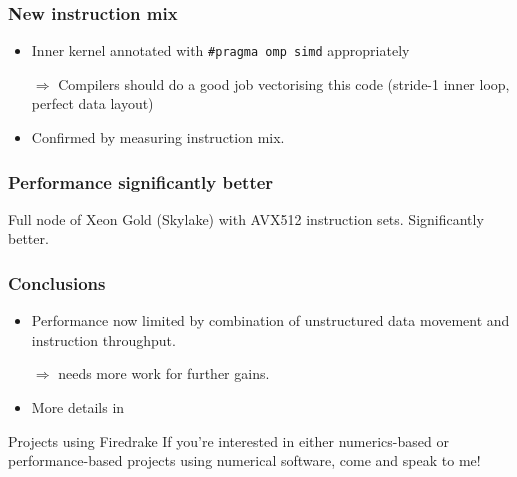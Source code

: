 \documentclass[presentation,aspectratio=43,10pt]{beamer}
\begin{document}
\begin{frame}
  \frametitle{New instruction mix}
  \begin{itemize}
  \item Inner kernel annotated with \texttt{\#pragma omp simd} appropriately
  \item[$\Rightarrow$] Compilers should do a good job vectorising this
    code (stride-1 inner loop, perfect data layout)
  \item Confirmed by measuring instruction mix.
    \begin{center}
    \end{center}
  \end{itemize}
\end{frame}

\begin{frame}
  \frametitle{Performance significantly better}
  \begin{center}
    Full node of Xeon Gold (Skylake) with AVX512 instruction sets.
    Significantly better.
  \end{center}
\end{frame}

\begin{frame}
  \frametitle{Conclusions}
  \begin{itemize}
  \item Performance now limited by combination of unstructured data
    movement and instruction throughput.
  \item[$\Rightarrow$] needs more work for further gains.
  \item More details in 
  \end{itemize}

  \begin{exampleblock}{Projects using Firedrake}
    If you're interested in either numerics-based or performance-based
    projects using numerical software, come and speak to me!
  \end{exampleblock}
\end{frame}
\end{document}
